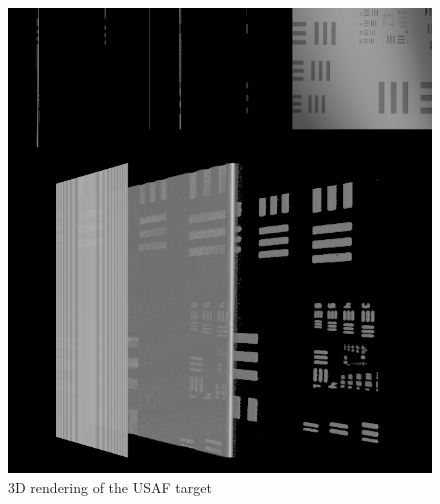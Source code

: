     \begin{figure}[hbt]
        \centering
        \includegraphics[width=1\linewidth]{gfx/3d/target}
        \caption[]{3D rendering of the USAF target}\label{fig:targer-3d}
    \end{figure}
